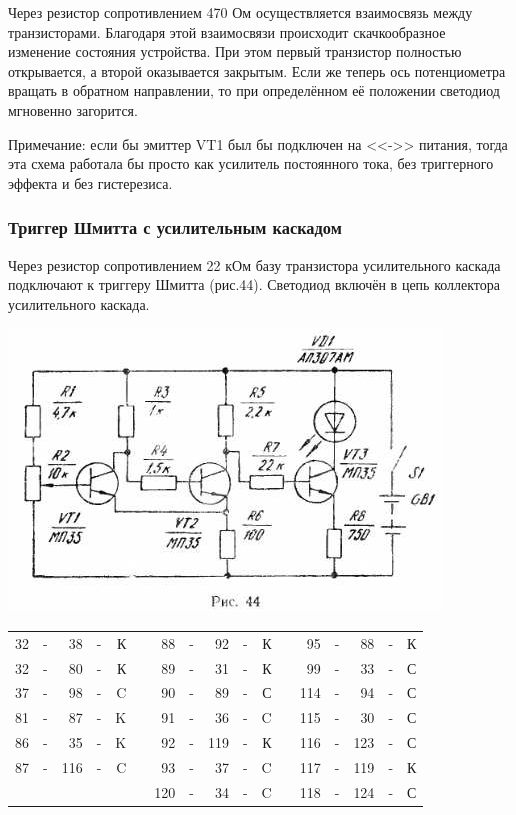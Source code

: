 \documentclass[12pt]{article}
\begin{document}
Через резистор сопротивлением 470 Ом осуществляется взаимосвязь между транзисторами. Благодаря этой взаимосвязи происходит скачкообразное изменение состояния устройства. При этом первый транзистор полностью открывается, а второй оказывается закрытым. Если же теперь ось потенциометра вращать в обратном направлении, то при определённом её положении светодиод мгновенно загорится.

Примечание: если бы эмиттер VT1 был бы подключен на <<->> питания, тогда эта схема работала бы просто как усилитель постоянного тока, без триггерного эффекта и без гистерезиса.

\subsubsection{Триггер Шмитта с усилительным каскадом}

Через резистор сопротивлением 22 кОм базу транзистора усилительного каскада подключают к триггеру Шмитта (рис.44). Светодиод включён в цепь коллектора усилительного каскада.

\newpage

\hspace*{0.7cm}\includegraphics[scale=0.99, angle=0]{ekon3_045_1}

\hrulefill

\begin{tabular}{r c r c r p{2cm} r c r c r p{2cm} r c r c r}
32 & - &  38 & - & К &     & 88  & - & 92  & - & К &    &  95 & - &  88 & - & К\\
32 & - &  80 & - & К &     & 89  & - & 31  & - & К &    &  99 & - &  33 & - & С\\
37 & - &  98 & - & C &     & 90  & - & 89  & - & С &    & 114 & - &  94 & - & С\\
81 & - &  87 & - & K &     & 91  & - & 36  & - & C &    & 115 & - &  30 & - & С\\
86 & - &  35 & - & K &     & 92  & - & 119 & - & К &    & 116 & - & 123 & - & С\\
87 & - & 116 & - & C &     & 93  & - & 37  & - & C &    & 117 & - & 119 & - & К\\
   &   &     &   &   &     & 120 & - & 34  & - & C &    & 118 & - & 124 & - & С\\
\end{tabular}
\end{document}
